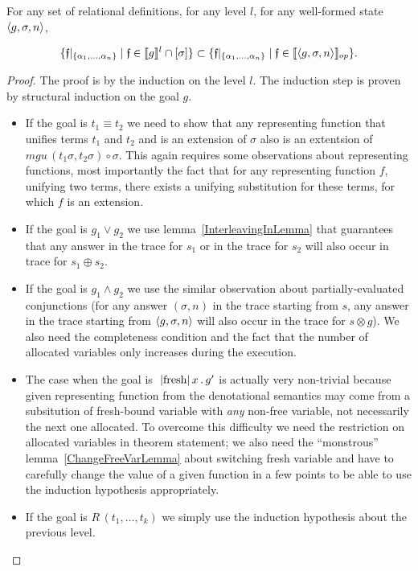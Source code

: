 \begin{lemma}
\label{GenCompletenessLemma}
For any set of relational definitions, for any level $l$, for any well-formed state $\left<{g, \sigma, n}\right>$,

\[
\{\mathfrak{f}|_{\{\alpha_1,\dots,\alpha_n\}} \mid \mathfrak{f} \in \llbracket{g}\rrbracket^l \cap [\sigma]\} \subset \{\mathfrak{f}|_{\{\alpha_1,\dots,\alpha_n\}} \mid \mathfrak{f} \in \llbracket{\left<{g, \sigma, n}\right>}\rrbracket_{op}\}.
\]
\end{lemma}
\begin{proof}
The proof is by the induction on the level $l$. The induction step is proven by structural induction on the goal $g$.
\begin{itemize}
\item If the goal is $t_1\equiv t_2$ we need to show that any representing function that unifies terms $t_1$ and $t_2$ and is an extension of $\sigma$ also is an extentsion of $mgu\,(t_1 \sigma, t_2 \sigma) \circ \sigma$. This again requires some observations about representing functions, most importantly the fact that for any representing function $f$, unifying two terms, there exists a unifying substitution for these terms, for which $f$ is an extension.
\item If the goal is $g_1\vee g_2$ we use lemma~\ref{InterleavingInLemma} that guarantees that any answer in the trace for $s_1$ or in the trace for $s_2$ will also occur in trace for $s_1 \oplus s_2$.
\item If the goal is $g_1\wedge g_2$ we use the similar observation about partially-evaluated conjunctions (for any answer $(\sigma, n)$ in the trace starting from $s$, any answer in the trace starting from $\left<{g, \sigma, n}\right>$ will also occur in the trace for $s \otimes g$). We also need the completeness condition and the fact that the number of allocated variables only increases during the execution.
\item The case when the goal is $\mbox{\lstinline|fresh|}\,x\,.\,g'$ is actually very non-trivial because given representing function from the denotational semantics may come from a subsitution of fresh-bound variable with \emph{any} non-free variable, not necessarily the next one allocated. To overcome this difficulty we need the restriction on allocated variables in theorem statement; we also need the ``monstrous'' lemma~\ref{ChangeFreeVarLemma} about switching fresh variable and have to carefully change the value of a given function in a few points to be able to use the induction hypothesis appropriately.
\item If the goal is $R\,(t_1,\dots,t_k)$ we simply use the induction hypothesis about the previous level.
\end{itemize}
\end{proof}

